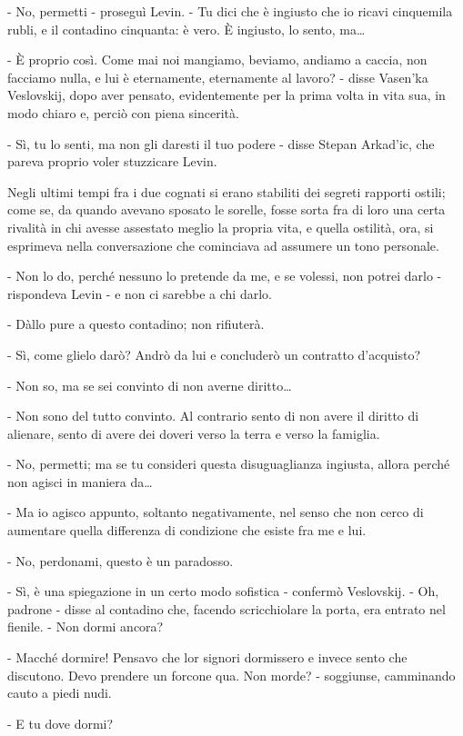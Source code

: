 - No, permetti - proseguì Levin. - Tu dici che è ingiusto che io ricavi cinquemila rubli, e il contadino cinquanta: è vero. È ingiusto, lo sento, ma\ldots{} 

- È proprio così. Come mai noi mangiamo, beviamo, andiamo a caccia, non facciamo nulla, e lui è eternamente, eternamente al lavoro? - disse Vasen'ka Veslovskij, dopo aver pensato, evidentemente per la prima volta in vita sua, in modo chiaro e, perciò con piena sincerità. 

- Sì, tu lo senti, ma non gli daresti il tuo podere - disse Stepan Arkad'ic, che pareva proprio voler stuzzicare Levin. 

Negli ultimi tempi fra i due cognati si erano stabiliti dei segreti rapporti ostili; come se, da quando avevano sposato le sorelle, fosse sorta fra di loro una certa rivalità in chi avesse assestato meglio la propria vita, e quella ostilità, ora, si esprimeva nella conversazione che cominciava ad assumere un tono personale. 

- Non lo do, perché nessuno lo pretende da me, e se volessi, non potrei darlo - rispondeva Levin - e non ci sarebbe a chi darlo. 

- Dàllo pure a questo contadino; non rifiuterà. 

- Sì, come glielo darò? Andrò da lui e concluderò un contratto d'acquisto? 

- Non so, ma se sei convinto di non averne diritto\ldots{} 

- Non sono del tutto convinto. Al contrario sento di non avere il diritto di alienare, sento di avere dei doveri verso la terra e verso la famiglia. 

- No, permetti; ma se tu consideri questa disuguaglianza ingiusta, allora perché non agisci in maniera da\ldots{} 

- Ma io agisco appunto, soltanto negativamente, nel senso che non cerco di aumentare quella differenza di condizione che esiste fra me e lui. 

- No, perdonami, questo è un paradosso. 

- Sì, è una spiegazione in un certo modo sofistica - confermò Veslovskij. - Oh, padrone - disse al contadino che, facendo scricchiolare la porta, era entrato nel fienile. - Non dormi ancora? 

- Macché dormire! Pensavo che lor signori dormissero e invece sento che discutono. Devo prendere un forcone qua. Non morde? - soggiunse, camminando cauto a piedi nudi. 

- E tu dove dormi? 

